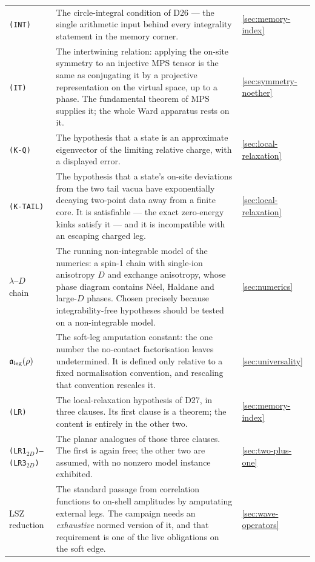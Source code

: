 {\begin{longtable}{@{}p{}p{}p{}@{}}
\texttt{(INT)} & The circle-integral condition of D26 --- the single
arithmetic input behind every integrality statement in the memory corner. & \cref{sec:memory-index}\\

\texttt{(IT)} & The intertwining relation: applying the on-site symmetry to an
injective MPS tensor is the same as conjugating it by a projective
representation on the virtual space, up to a phase. The fundamental theorem of
MPS supplies it; the whole Ward apparatus rests on it. & \cref{sec:symmetry-noether}\\

\texttt{(K-Q)} & The hypothesis that a state is an approximate eigenvector of
the limiting relative charge, with a displayed error. & \cref{sec:local-relaxation}\\

\texttt{(K-TAIL)} & The hypothesis that a state's on-site deviations from the
two tail vacua have exponentially decaying two-point data away from a finite
core. It is satisfiable --- the exact zero-energy kinks satisfy it --- and it
is incompatible with an escaping charged leg. & \cref{sec:local-relaxation}\\

$\lambda$--$D$ chain & The running non-integrable model of the numerics: a
spin-1 chain with single-ion anisotropy $D$ and exchange anisotropy, whose
phase diagram contains N\'eel, Haldane and large-$D$ phases. Chosen precisely
because integrability-free hypotheses should be tested on a non-integrable
model. & \cref{sec:numerics}\\

$\mathfrak{a}_{\mathrm{leg}}(\rho)$ & The soft-leg amputation constant: the one number the
no-contact factorisation leaves undetermined. It is defined only relative to a
fixed normalisation convention, and rescaling that convention rescales it. & \cref{sec:universality}\\

\texttt{(LR)} & The local-relaxation hypothesis of D27, in three clauses. Its
first clause is a theorem; the content is entirely in the other two. & \cref{sec:memory-index}\\

\texttt{(LR1$_{2D}$)--(LR3$_{2D}$)} & The planar analogues of those three
clauses. The first is again free; the other two are assumed, with no nonzero
model instance exhibited. & \cref{sec:two-plus-one}\\

LSZ reduction & The standard passage from correlation functions to on-shell
amplitudes by amputating external legs. The campaign needs an
\emph{exhaustive} normed version of it, and that requirement is one of the
live obligations on the soft edge. & \cref{sec:wave-operators}\\


\end{longtable}}
